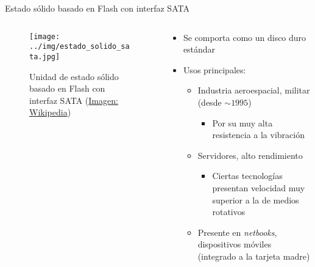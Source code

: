 \documentclass[presentation]{beamer}
\begin{document}
\begin{frame}[label={sec:orgf221bb3}]{Estado sólido basado en Flash con interfaz SATA}
\begin{columns} \begin{column}{0.4\textwidth}
\begin{figure}[htbp]
\centering
\texttt{[image: ../img/estado\_solido\_sata.jpg]}
\caption{Unidad de estado sólido basado en Flash con interfaz SATA (\href{https://en.wikipedia.org/wiki/Solid-state\\\_drive}{Imagen: Wikipedia})}
\end{figure}
\end{column} \begin{column}{0.6\textwidth}
\begin{itemize}
\item Se comporta como un disco duro estándar
\item Usos principales:
\begin{itemize}
\item Industria aeroespacial, militar (desde \(\sim 1995\))
\begin{itemize}
\item Por su muy alta resistencia a la vibración
\end{itemize}
\item Servidores, alto rendimiento
\begin{itemize}
\item Ciertas tecnologías presentan velocidad muy superior a la de
medios rotativos
\end{itemize}
\item Presente en \emph{netbooks}, dispositivos móviles (integrado a la
tarjeta madre)
\end{itemize}
\end{itemize}
\end{column} \end{columns}
\end{frame}
\end{document}
